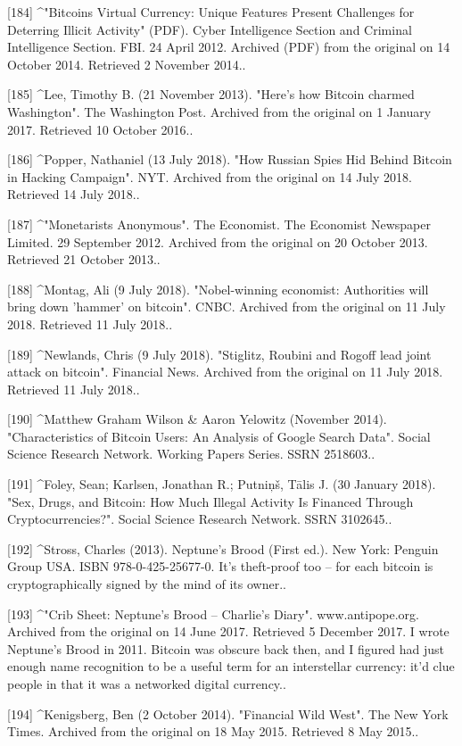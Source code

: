 [184]
^"Bitcoins Virtual Currency: Unique Features Present Challenges for Deterring Illicit Activity" (PDF). Cyber Intelligence Section and Criminal Intelligence Section. FBI. 24 April 2012. Archived (PDF) from the original on 14 October 2014. Retrieved 2 November 2014..

[185]
^Lee, Timothy B. (21 November 2013). "Here's how Bitcoin charmed Washington". The Washington Post. Archived from the original on 1 January 2017. Retrieved 10 October 2016..

[186]
^Popper, Nathaniel (13 July 2018). "How Russian Spies Hid Behind Bitcoin in Hacking Campaign". NYT. Archived from the original on 14 July 2018. Retrieved 14 July 2018..

[187]
^"Monetarists Anonymous". The Economist. The Economist Newspaper Limited. 29 September 2012. Archived from the original on 20 October 2013. Retrieved 21 October 2013..

[188]
^Montag, Ali (9 July 2018). "Nobel-winning economist: Authorities will bring down 'hammer' on bitcoin". CNBC. Archived from the original on 11 July 2018. Retrieved 11 July 2018..

[189]
^Newlands, Chris (9 July 2018). "Stiglitz, Roubini and Rogoff lead joint attack on bitcoin". Financial News. Archived from the original on 11 July 2018. Retrieved 11 July 2018..

[190]
^Matthew Graham Wilson & Aaron Yelowitz (November 2014). "Characteristics of Bitcoin Users: An Analysis of Google Search Data". Social Science Research Network. Working Papers Series. SSRN 2518603..

[191]
^Foley, Sean; Karlsen, Jonathan R.; Putniņš, Tālis J. (30 January 2018). "Sex, Drugs, and Bitcoin: How Much Illegal Activity Is Financed Through Cryptocurrencies?". Social Science Research Network. SSRN 3102645..

[192]
^Stross, Charles (2013). Neptune's Brood (First ed.). New York: Penguin Group USA. ISBN 978-0-425-25677-0. It's theft-proof too – for each bitcoin is cryptographically signed by the mind of its owner..

[193]
^"Crib Sheet: Neptune's Brood – Charlie's Diary". www.antipope.org. Archived from the original on 14 June 2017. Retrieved 5 December 2017. I wrote Neptune's Brood in 2011. Bitcoin was obscure back then, and I figured had just enough name recognition to be a useful term for an interstellar currency: it'd clue people in that it was a networked digital currency..

[194]
^Kenigsberg, Ben (2 October 2014). "Financial Wild West". The New York Times. Archived from the original on 18 May 2015. Retrieved 8 May 2015..

